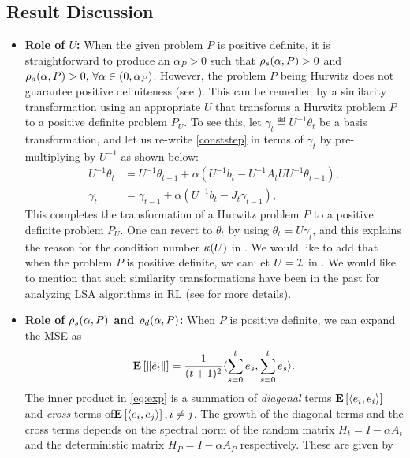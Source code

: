 \subsection{Result Discussion}
\begin{itemize}[leftmargin=*, before = \leavevmode\vspace{-\baselineskip}]
\item \textbf{Role of $U$:} When the given problem $P$ is positive definite, it is straightforward to produce an $\alpha_P>0$ such that $\rho_s(\alpha,P)>0$ and $\rho_d(\alpha,P)>0,\,\forall \alpha\in(0,\alpha_P)$. However, the problem $P$ being Hurwitz does not guarantee positive definiteness (see ). This can be remedied by a similarity transformation using an appropriate $U$ that transforms a Hurwitz problem $P$ to a positive definite problem $P_U$. To see this, let $\gamma_t\eqdef U^{-1 }\theta_t$ be a basis transformation, and let us re-write \eqref{conststep} in terms of $\gamma_t$ by pre-multiplying by $U^{-1}$ as shown below:
\begin{align*}
U^{-1}\theta_t&=U^{-1}\theta_{t-1}+\alpha(U^{-1} b_t- U^{-1}A_t U U^{-1}\theta_{t-1}),\\
\gamma_t&=\gamma_{t-1}+\alpha(U^{-1} b_t- J_t\gamma_{t-1}),
\end{align*}
This completes the transformation of a Hurwitz problem $P$ to a positive definite problem $P_U$. One can revert to $\theta_t$ by using $\theta_t=U\gamma_t$, and this explains the reason for the condition number $\kappa(U)$ in . We would like to add that when the problem $P$ is positive definite, we can let $U=\mathcal{I}$ in . We would like to mention that such similarity transformations have been in the past for analyzing LSA algorithms in RL \cite{lihong} (see  for more details).
\item \textbf{Role of $\rho_s(\alpha,P)$ and $\rho_d(\alpha,P)$:} When $P$ is positive definite, we can expand the MSE as \begin{align}\label{eq:exp}\mathbf{E}\left[\left\| \hat{e}_t\right\|\right]=\frac{1}{(t+1)^2}\langle\sum_{s=0}^t e_s,\sum_{s=0}^t e_s\rangle.\end{align} The inner product in \eqref{eq:exp} is a summation of \emph{diagonal} terms $\mathbf{E}\left[\langle e_i,e_i\rangle\right]$ and \emph{cross} terms of$\mathbf{E}\left[\langle e_i,e_j\rangle\right],i\neq j$. The growth of the diagonal terms and the cross terms depends on the spectral norm of the random matrix $H_t=I-\alpha A_t$ and the deterministic matrix $H_P=I-\alpha A_P$ respectively. These are given by
\begin{comment}
The output $\thh_t$ of the algorithm \eqref{eq:lsa} is the average of the internal states at times $s=0,\ldots,t-1$. The error dynamics of the internal states by looking at the behavior of $e_t\eqdef \theta_t-\ts$.

\end{comment}
\end{itemize}
